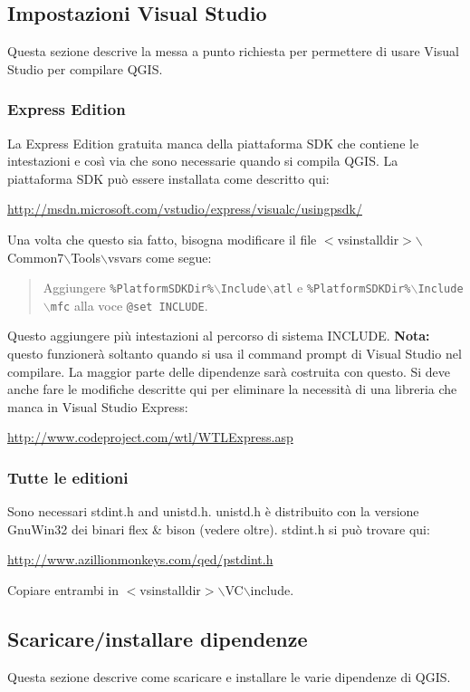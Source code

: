 \subsection{Impostazioni Visual Studio}
Questa sezione descrive la messa a punto richiesta per permettere di usare Visual Studio per compilare QGIS. 

\subsubsection{Express Edition}
La Express Edition gratuita manca della piattaforma SDK che contiene le intestazioni e così via che sono necessarie quando si compila QGIS. La piattaforma SDK può essere installata come descritto qui:


\url{http://msdn.microsoft.com/vstudio/express/visualc/usingpsdk/}

Una volta che questo sia fatto, bisogna modificare il file $<$vsinstalldir$>$$\backslash$Common7$\backslash$Tools$\backslash$vsvars come segue:

	\begin{quotation}
Aggiungere \texttt{\%PlatformSDKDir\%$\backslash$Include$\backslash$atl} e \texttt{\%PlatformSDKDir\%$\backslash$Include$\backslash$mfc} alla voce \texttt{@set INCLUDE}.
	\end{quotation}
Questo aggiungere più intestazioni al percorso di sistema INCLUDE. \textbf{Nota:} questo funzionerà soltanto quando si usa il command prompt di Visual Studio nel compilare. La maggior parte delle dipendenze sarà costruita con questo. Si deve anche fare le modifiche descritte qui per eliminare la necessità di una libreria che manca in Visual Studio Express:

\url{http://www.codeproject.com/wtl/WTLExpress.asp}


\subsubsection{Tutte le editioni}
Sono necessari stdint.h and unistd.h. unistd.h è distribuito con la versione GnuWin32 dei binari flex \& bison (vedere oltre). stdint.h si può trovare qui:

\url{http://www.azillionmonkeys.com/qed/pstdint.h}

Copiare entrambi in $<$vsinstalldir$>$$\backslash$VC$\backslash$include.

\subsection{Scaricare/installare dipendenze}
Questa sezione descrive come scaricare e installare le varie dipendenze di QGIS.

